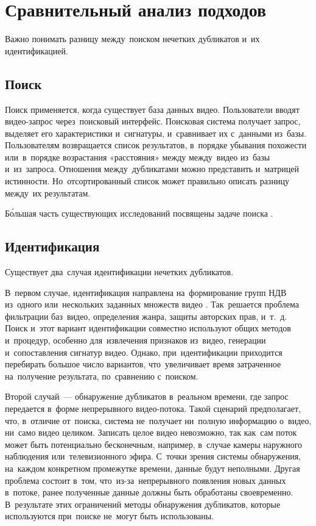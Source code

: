 
\section{Сравнительный анализ подходов}


Важно понимать разницу между~поиском нечетких дубликатов и~их идентификацией.

\subsection{Поиск}

Поиск применяется, когда существует база данных видео.
Пользователи вводят видео-запрос через~поисковый интерфейс.
Поисковая система получает запрос, выделяет его характеристики и~сигнатуры,
и~сравнивает их с~данными из~базы.
Пользователям возвращается список результатов,
в~порядке убывания похожести или~в~порядке возрастания «расстояния» между
между~видео из~базы и~из~запроса.
Отношения между~дубликатами можно представить и~матрицей истинности.
Но~отсортированный список может правильно
описать разницу между~их результатам.

Бо́льшая часть существующих исследований посвящены задаче
поиска \cite{Liu:2013}.

\subsection{Идентификация}

Существует два~случая идентификации нечетких дубликатов.

В~первом случае, идентификация направлена на~формирование групп НДВ
из~одного или~нескольких заданных множеств видео
\cite{Tan:2008} \cite{Wu:2009} \cite{Zhao:2009}.
Так~решается проблема фильтрации баз~видео,
определения жанра, защиты авторских прав, и~т.~д.
Поиск и~этот вариант идентификации совместно используют
общих методов и~процедур, особенно для~извлечения признаков из~видео,
генерации и~сопоставления сигнатур видео.
Однако, при~идентификации приходится перебирать большое число вариантов,
что~увеличивает время затраченное на~получение результата,
по~сравнению с~поиском.

Второй случай~— обнаружение дубликатов в~реальном времени,
где запрос передается в~форме непрерывного видео-потока.
Такой сценарий предполагает, что, в~отличие от~поиска, система не~получает
ни~полную информацию о~видео, ни~само видео целиком.
Записать целое видео невозможно,
так как~сам поток может быть потенциально бесконечным, например,
в~случае камеры наружного наблюдения или~телевизионного эфира.
С~точки зрения системы обнаружения, на~каждом конкретном промежутке времени,
данные будут неполными. Другая проблема состоит в~том, что~из-за~непрерывного
появления новых данных в~потоке, ранее полученные данные должны
быть обработаны своевременно.
В~результате этих ограничений методы обнаружения дубликатов,
которые используются при~поиске не~могут быть использованы.

